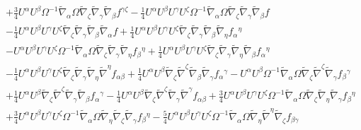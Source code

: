 \documentclass[10pt,letterpaper]{article}
\numberwithin{equation}{section}
\begin{document}
\begin{eqnarray}
 && + \tfrac{3}{4} U^{\alpha } U^{\beta } \Omega^{-1} \tilde{\nabla}_{\alpha }\Omega \tilde{\nabla}_{\zeta }\tilde{\nabla}_{\gamma }\tilde{\nabla}_{\beta }f^{\gamma \zeta } -  \tfrac{1}{4} U^{\alpha } U^{\beta } U^{\gamma } U^{\zeta } \Omega^{-1} \tilde{\nabla}_{\alpha }\Omega \tilde{\nabla}_{\zeta }\tilde{\nabla}_{\gamma }\tilde{\nabla}_{\beta }f \nonumber \\ 
 && -  \tfrac{1}{4} U^{\alpha } U^{\beta } U^{\gamma } U^{\zeta } \tilde{\nabla}_{\zeta }\tilde{\nabla}_{\gamma }\tilde{\nabla}_{\beta }\tilde{\nabla}_{\alpha }f + \tfrac{1}{4} U^{\alpha } U^{\beta } U^{\gamma } U^{\zeta } \tilde{\nabla}_{\zeta }\tilde{\nabla}_{\gamma }\tilde{\nabla}_{\beta }\tilde{\nabla}_{\eta }f_{\alpha }{}^{\eta } \nonumber \\ 
 && -  U^{\alpha } U^{\beta } U^{\gamma } U^{\zeta } \Omega^{-1} \tilde{\nabla}_{\alpha }\Omega \tilde{\nabla}_{\zeta }\tilde{\nabla}_{\gamma }\tilde{\nabla}_{\eta }f_{\beta }{}^{\eta } + \tfrac{1}{4} U^{\alpha } U^{\beta } U^{\gamma } U^{\zeta } \tilde{\nabla}_{\zeta }\tilde{\nabla}_{\gamma }\tilde{\nabla}_{\eta }\tilde{\nabla}_{\beta }f_{\alpha }{}^{\eta } \nonumber \\ 
 && -  \tfrac{1}{4} U^{\alpha } U^{\beta } U^{\gamma } U^{\zeta } \tilde{\nabla}_{\zeta }\tilde{\nabla}_{\gamma }\tilde{\nabla}_{\eta }\tilde{\nabla}^{\eta }f_{\alpha \beta } + \tfrac{1}{4} U^{\alpha } U^{\beta } \tilde{\nabla}_{\zeta }\tilde{\nabla}^{\zeta }\tilde{\nabla}_{\beta }\tilde{\nabla}_{\gamma }f_{\alpha }{}^{\gamma } -  U^{\alpha } U^{\beta } \Omega^{-1} \tilde{\nabla}_{\alpha }\Omega \tilde{\nabla}_{\zeta }\tilde{\nabla}^{\zeta }\tilde{\nabla}_{\gamma }f_{\beta }{}^{\gamma } \nonumber \\ 
 && + \tfrac{1}{4} U^{\alpha } U^{\beta } \tilde{\nabla}_{\zeta }\tilde{\nabla}^{\zeta }\tilde{\nabla}_{\gamma }\tilde{\nabla}_{\beta }f_{\alpha }{}^{\gamma } -  \tfrac{1}{4} U^{\alpha } U^{\beta } \tilde{\nabla}_{\zeta }\tilde{\nabla}^{\zeta }\tilde{\nabla}_{\gamma }\tilde{\nabla}^{\gamma }f_{\alpha \beta } + \tfrac{3}{4} U^{\alpha } U^{\beta } U^{\gamma } U^{\zeta } \Omega^{-1} \tilde{\nabla}_{\alpha }\Omega \tilde{\nabla}_{\zeta }\tilde{\nabla}_{\eta }\tilde{\nabla}_{\gamma }f_{\beta }{}^{\eta } \nonumber \\ 
 && + \tfrac{3}{4} U^{\alpha } U^{\beta } U^{\gamma } U^{\zeta } \Omega^{-1} \tilde{\nabla}_{\alpha }\Omega \tilde{\nabla}_{\eta }\tilde{\nabla}_{\zeta }\tilde{\nabla}_{\gamma }f_{\beta }{}^{\eta } -  \tfrac{5}{4} U^{\alpha } U^{\beta } U^{\gamma } U^{\zeta } \Omega^{-1} \tilde{\nabla}_{\alpha }\Omega \tilde{\nabla}_{\eta }\tilde{\nabla}^{\eta }\tilde{\nabla}_{\zeta }f_{\beta \gamma } \nonumber \\ 

\end{eqnarray}
\end{document}
